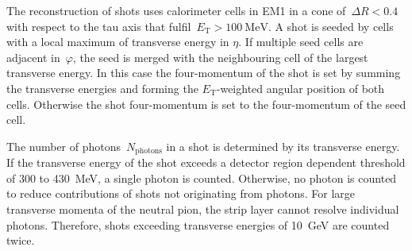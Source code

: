 The reconstruction of shots uses calorimeter cells in EM1 in a cone
of~$\Delta R < 0.4$ with respect to the tau axis that
fulfil~$E_\text{T} > \SI{100}{\MeV}$. A shot is seeded by cells with a local
maximum of transverse energy in $\eta$.
If multiple seed cells are adjacent in~$\varphi$, the seed is merged with the
neighbouring cell of the largest transverse energy. In this case the
four-momentum of the shot is set by summing the transverse energies and forming
the $E_\text{T}$-weighted angular position of both cells. Otherwise the shot
four-momentum is set to the four-momentum of the seed cell.

The number of photons~$N_\text{photons}$ in a shot is determined by its
transverse energy. If the transverse energy of the shot exceeds a detector
region dependent threshold of \num{300} to \SI{430}{\MeV}, a single photon is
counted. Otherwise, no photon is counted to reduce contributions of shots not
originating from photons. For large transverse momenta of the neutral pion, the
strip layer cannot resolve individual photons. Therefore, shots exceeding
transverse energies of \SI{10}{\GeV} are counted twice.

